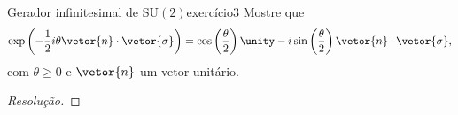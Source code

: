 \begin{exercício}{Gerador infinitesimal de \(\mathrm{SU}(2)\)}{exercício3}
    Mostre que
    \begin{equation*}
        \exp\left(-\frac12i\theta \vetor{n} \cdot \vetor{\sigma}\right) = \cos\left(\frac{\theta}{2}\right) \unity - i \sin\left(\frac{\theta}{2}\right)\vetor{n}\cdot\vetor{\sigma},
    \end{equation*}
    com \(\theta \geq 0\) e \(\vetor{n}\) um vetor unitário.
\end{exercício}
\begin{proof}[Resolução]

\end{proof}
